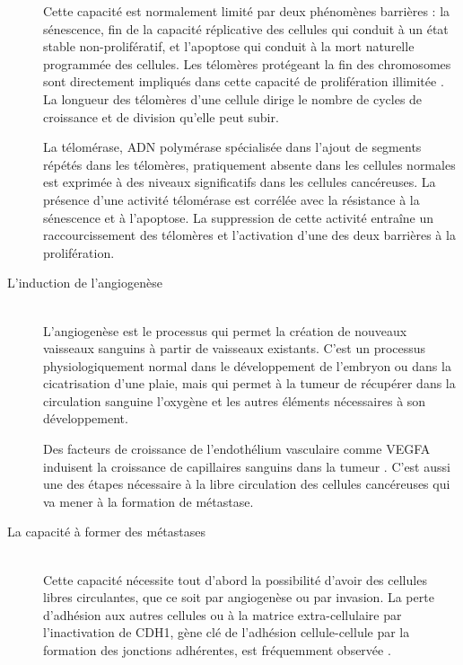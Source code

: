 \begin{description}
          Cette capacité est normalement limité par deux phénomènes barrières : la sénescence, fin de la capacité réplicative des cellules qui conduit à un état stable non-prolifératif, et l'apoptose qui conduit à la mort naturelle programmée des cellules.
          Les télomères protégeant la fin des chromosomes sont directement impliqués dans cette capacité de prolifération illimitée \citep{Blasco2005}.
          La longueur des télomères d'une cellule dirige le nombre de cycles de croissance et de division qu'elle peut subir.

          La télomérase, \acs{ADN} polymérase spécialisée dans l'ajout de segments répétés dans les télomères, pratiquement absente dans les cellules normales est exprimée à des niveaux significatifs dans les cellules cancéreuses.
          La présence d'une activité télomérase est corrélée avec la résistance à la sénescence et à l'apoptose.
          La suppression de cette activité entraîne un raccourcissement des télomères et l'activation d'une des deux barrières à la prolifération.

        \item [L'induction de l'angiogenèse]                            \hfill \\
          L'angiogenèse est le processus qui permet la création de nouveaux vaisseaux sanguins à partir de vaisseaux existants.
          C'est un processus physiologiquement normal dans le développement de l'embryon ou dans la cicatrisation d'une plaie, mais qui permet à la tumeur de récupérer dans la circulation sanguine l'oxygène et les autres éléments nécessaires à son développement.

          Des facteurs de croissance de l'endothélium vasculaire comme \acs{VEGFA} induisent la croissance de capillaires sanguins dans la tumeur \cite{Lu2012}.
          C'est aussi une des étapes nécessaire à la libre circulation des cellules cancéreuses qui va mener à la formation de métastase.

        \item [La capacité à former des métastases]                     \hfill \\
          Cette capacité nécessite tout d'abord la possibilité d'avoir des cellules libres circulantes, que ce soit par angiogenèse ou par invasion.
          La perte d'adhésion aux autres cellules ou à la matrice extra-cellulaire par l'inactivation de \acs{CDH1}, gène clé de l'adhésion cellule-cellule par la formation des jonctions adhérentes, est fréquemment observée \citep{Berx2009}.


\end{description}
